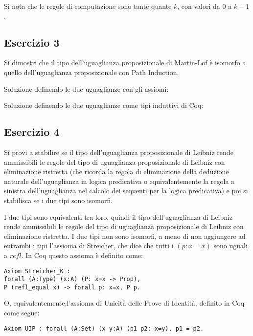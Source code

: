 Si nota che le regole di computazione sono tante quante $k$, con valori da $0$ a $k-1$.

\subsection{Esercizio 3}\label{isomMLPI}
\begin{thm}
	Si dimostri che il tipo dell'uguaglianza proposizionale di Martin-Lof è isomorfo a quello dell'uguaglianza proposizionale con Path Induction.
\end{thm}
Soluzione definendo le due uguaglianze con gli assiomi:


Soluzione definendo le due uguaglianze come tipi induttivi di Coq:


\subsection{Esercizio 4}
\begin{thm}
	Si provi a stabilire se il tipo dell'uguaglianza proposizionale di Leibniz rende ammissibili le regole del tipo di uguaglianza proposizionale di Leibniz con eliminazione ristretta (che ricorda la regola di eliminazione della deduzione naturale dell'uguaglianza in logica predicativa o equivalentemente la regola a sinistra dell'uguaglianza nel calcolo dei sequenti per la logica predicativa) e poi si stabilisca se i due tipi sono isomorfi.
\end{thm}
I due tipi sono equivalenti tra loro, quindi il tipo dell'uguaglianza di Leibniz rende ammissibili le regole del tipo di uguaglianza proposizionale di Leibniz con eliminazione ristretta. I due tipi non sono isomorfi, a meno di non aggiungere ad entrambi i tipi l'assioma di Streicher, che dice che tutti i $(p : x = x)$ sono uguali a $refl$. In Coq questo assioma è definito come:
\begin{lstlisting}[language=Coq]
Axiom Streicher_K : 
forall (A:Type) (x:A) (P: x=x -> Prop), 
P (refl_equal x) -> forall p: x=x, P p. 
\end{lstlisting}
O, equivalentemente,l'assioma di Unicità delle Prove di Identità, definito in Coq come segue:
\begin{lstlisting}[language=Coq]
Axiom UIP : forall (A:Set) (x y:A) (p1 p2: x=y), p1 = p2. 
\end{lstlisting}

